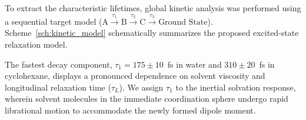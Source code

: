 \documentclass[journal=jpcbfk,manuscript=article,layout=twocolumn]{achemso}
\begin{document}
To extract the characteristic lifetimes, global kinetic analysis was performed using a sequential target model ($\text{A} \xrightarrow{\tau_1} \text{B} \xrightarrow{\tau_2} \text{C} \xrightarrow{\tau_3} \text{Ground State}$). Scheme~\ref{sch:kinetic_model} schematically summarizes the proposed excited-state relaxation model.

\begin{scheme*}[t]
\centering
{}
\caption{Schematic Representation of the Photophysical Relaxation Cascade and Charge Transfer Model in Functionalized h-BN Quantum Dots Following Ultrafast Photoexcitation}
\label{sch:kinetic_model}
\end{scheme*}

The fastest decay component, $\tau_1 = 175 \pm 10$~fs in water and $310 \pm 20$~fs in cyclohexane, displays a pronounced dependence on solvent viscosity and longitudinal relaxation time ($\tau_L$). We assign $\tau_1$ to the inertial solvation response, wherein solvent molecules in the immediate coordination sphere undergo rapid librational motion to accommodate the newly formed dipole moment.
\end{document}
